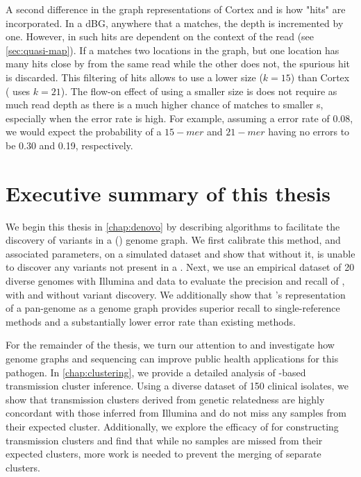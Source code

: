 A second difference in the graph representations of Cortex and \pandora{} is how \kmer{} "hits" are incorporated. In a dBG, anywhere that a \kmer{} matches, the depth is incremented by one. However, in \pandora{} such hits are dependent on the context of the read (see \autoref{sec:quasi-map}). If a \kmer{} matches two locations in the graph, but one location has many hits close by from the same read while the other does not, the spurious hit is discarded. This filtering of \kmer{} hits allows \pandora{} to use a lower \kmer{} size ($k=15$) than Cortex (\mykrobe{} uses $k=21$). The flow-on effect of using a smaller \kmer{} size is \pandora{} does not require as much read depth as there is a much higher chance of matches to smaller \kmer{}s, especially when the error rate is high. For example, assuming a \ont{} error rate of 0.08, we would expect the probability of a $15-mer$ and $21-mer$ having no errors to be 0.30 and 0.19, respectively.


\section{Executive summary of this thesis}

We begin this thesis in \autoref{chap:denovo} by describing algorithms to facilitate the \denovo{} discovery of variants in a (\pandora{}) genome graph. We first calibrate this method, and associated parameters, on a simulated dataset and show that without it, \pandora{} is unable to discover any variants not present in a \panrg{}. Next, we use an empirical dataset of 20 diverse \ecoli{} genomes with Illumina and \ont{} data to evaluate the precision and recall of \pandora{}, with and without \denovo{} variant discovery. We additionally show that \pandora{}'s representation of a pan-genome as a genome graph provides superior recall to single-reference methods and a substantially lower \ont{} error rate than existing methods.

For the remainder of the thesis, we turn our attention to \mtb{} and investigate how genome graphs and \ont{} sequencing can improve public health applications for this pathogen. In \autoref{chap:clustering}, we provide a detailed analysis of \ont{}-based transmission cluster inference. Using a diverse dataset of 150 \mtb{} clinical isolates, we show that transmission clusters derived from \ont{} genetic relatedness are highly concordant with those inferred from Illumina and do not miss any samples from their expected cluster. Additionally, we explore the efficacy of \pandora{} for constructing transmission clusters and find that while no samples are missed from their expected clusters, more work is needed to prevent the merging of separate clusters.


